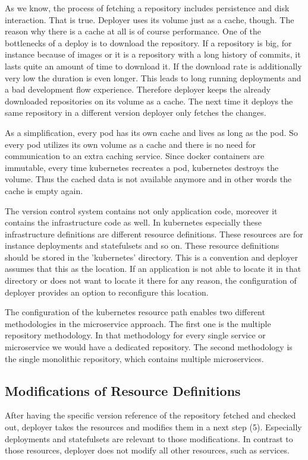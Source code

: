 As we know, the process of fetching a repository includes persistence and disk
interaction. That is true. Deployer uses its volume just as a cache, though. The reason
why there is a cache at all is of course performance. One of the bottlenecks of a deploy
is to download the repository. If a repository is big, for instance because of images or
it is a repository with a long history of commits, it lasts quite an amount of time to
download it. If the download rate is additionally very low the duration is even
longer. This leads to long running deployments and a bad development flow
experience. Therefore deployer keeps the already downloaded repositories on its volume as
a cache. The next time it deploys the same repository in a different version deployer only
fetches the changes.

As a simplification, every pod has its own cache and lives as long as the pod. So every
pod utilizes its own volume as a cache and there is no need for communication to an extra
caching service. Since docker containers are immutable, every time kubernetes recreates a
pod, kubernetes destroys the volume. Thus the cached data is not available anymore and in
other words the cache is empty again.

The version control system contains not only application code, moreover it contains the
infrastructure code as well. In kubernetes especially these infrastructure definitions are
different resource definitions. These resources are for instance deployments and
statefulsets and so on. These resource definitions should be stored in the 'kubernetes'
directory. This is a convention and deployer assumes that this as the location. If an
application is not able to locate it in that directory or does not want to locate it there
for any reason, the configuration of deployer provides an option to reconfigure this
location.

The configuration of the kubernetes resource path enables two different methodologies in
the microservice approach. The first one is the multiple repository methodology. In that
methodology for every single service or microservice we would have a dedicated repository.
The second methodology is the single monolithic repository, which contains multiple
microservices.

\subsection{Modifications of Resource Definitions}

After having the specific version reference of the repository fetched and checked out,
deployer takes the resources and modifies them in a next step (5). Especially deployments
and statefulsets are relevant to those modifications. In contrast to those resources,
deployer does not modify all other resources, such as services.

